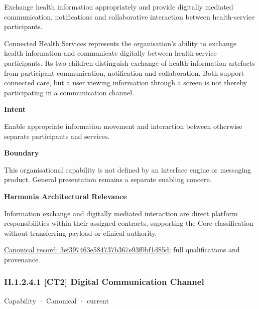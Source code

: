 Exchange health information appropriately and provide digitally mediated communication, notifications and collaborative interaction between health-service participants.



Connected Health Services represents the organisation's ability to exchange health information and communicate digitally between health-service participants. Its two children distinguish exchange of health-information artefacts from participant communication, notification and collaboration. Both support connected care, but a user viewing information through a screen is not thereby participating in a communication channel.



\textbf{Intent}



Enable appropriate information movement and interaction between otherwise separate participants and services.



\textbf{Boundary}



This organisational capability is not defined by an interface engine or messaging product. General presentation remains a separate enabling concern.



\textbf{Harmonia Architectural Relevance}



Information exchange and digitally mediated interaction are direct platform responsibilities within their assigned contracts, supporting the Core classification without transferring payload or clinical authority.


{\footnotesize \href{../../../../../../../continuum/strategy/capability/3ef397463e584737b367e93f0bf1d85d.md}{Canonical record: 3ef397463e584737b367e93f0bf1d85d}; full qualifications and provenance.}\par
\subsubsection*{II.1.2.4.1 [CT2] Digital Communication Channel}
\label{navigation:II.1.2.4.1}

\label{element:f5defe141228490598115fe41db89bd7}
{\small Capability · Canonical · current}\par

